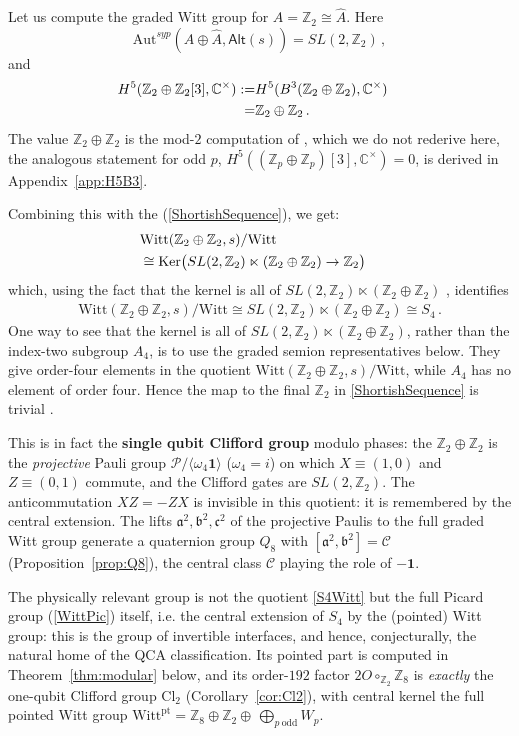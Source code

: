 \documentclass[aps,twocolumn,prx,floatfix,preprintnumbers, nofootinbib,10pt]{revtex4-2}
\numberwithin{equation}{section}
\theoremstyle{definition}
\theoremstyle{remark}
\theoremstyle{claim}
\newcommand{\Perm}{S}
\newcommand{\be}{\begin{equation}}
\newcommand{\ee}{\end{equation}}
\newcommand{\ba}{\begin{aligned}}
\newcommand{\ea}{\end{aligned}}
\newcommand{\Cl}{\text{Cl}}
\newcommand{\ga}{\mathfrak{a}}
\newcommand{\gb}{\mathfrak{b}}
\newcommand{\gc}{\mathfrak{c}}
\newcommand{\Z}{{\mathbb Z}}
\newcommand{\cC}{\mathcal{C}}
\newcommand{\cP}{\mathcal{P}}
\newcommand{\Witt}{\text{Witt}}
\newcommand{\pt}{\text{pt}}
\begin{document}
Let us compute the graded Witt group for $A=\Z_2 \cong \widehat{A}$. Here 
\be
 \text{Aut}^{syp}(A\oplus \widehat{A},\mathsf{Alt}(s)) = SL(2,\Z_2) \,,
\ee
and 
\be\label{H5ClassZ2}
\ba
H^5 (\Z_2\oplus \Z_2 [3], \mathbb{C}^\times)  :=& H^5 (B^3 (\Z_2 \oplus \Z_2), \mathbb{C}^\times)\cr 
=& \Z_2 \oplus \Z_2 \,.
\ea
\ee
The value $\Z_2\oplus\Z_2$ is the mod-$2$ computation of \cite{Bhardwaj:2024xcx}, which we do not rederive here, the analogous statement for odd $p$, $H^5((\Z_p\oplus\Z_p)[3],\mathbb C^\times)=0$, is derived in {Appendix}~\ref{app:H5B3}.


Combining this with the (\ref{ShortishSequence}), we get: 
\be 
\ba
&\Witt(\Z_2\oplus \Z_2,s)/\Witt\cr 
&\cong \text{Ker} \big({SL}(2,\Z_2)\ltimes (\Z_2\oplus \Z_2)\rightarrow \mathbb{Z}_2\big)
\ea
\ee
which, {using the fact that the kernel is all of $SL(2,\Z_2)\ltimes(\Z_2\oplus\Z_2)$ \cite{Bhardwaj:2024xcx},} identifies 
\be\label{S4Witt}
\ba
\boxed{\Witt (\Z_2\oplus \Z_2,s)/\Witt\cong  
SL(2,\Z_2) \ltimes (\Z_2 \oplus \Z_2) \cong 
\Perm_4 }\,.
\ea
\ee
One way to see that the kernel is all of
$SL(2,\Z_2)\ltimes(\Z_2\oplus\Z_2)$, rather than the index-two subgroup $A_4$, is
to use the graded semion representatives below.  They give order-four elements
in the quotient $\Witt(\Z_2\oplus\Z_2,s)/\Witt$, while $A_4$ has no element of
order four.  Hence the map to the final $\Z_2$ in
\eqref{ShortishSequence} is trivial \cite{Bhardwaj:2024xcx}.



This is in fact the {\bf single qubit Clifford group} modulo phases: the $\Z_2\oplus\Z_2$ is the \emph{projective} Pauli group $\cP/\langle \omega_4\bm 1\rangle$ ($\omega_4 = i$) on which $X\equiv(1,0)$ and $Z\equiv(0,1)$ commute, and the Clifford gates are $SL(2,\Z_2)$.  The anticommutation $XZ=-ZX$ is invisible in this quotient: it is remembered by the central extension. The lifts $\ga^2,\gb^2,\gc^2$ of the projective Paulis to the full graded Witt group generate a quaternion group $Q_8$ with $[\ga^2,\gb^2]=\cC$ (Proposition~\ref{prop:Q8}), the central class $\cC$ playing the role of $-\bm 1$.


 
The  physically relevant group is not the quotient \eqref{S4Witt} but the full Picard group  (\ref{WittPic})
itself, i.e. the central extension of $\Perm_4$ by the (pointed) Witt group: this is the group of invertible interfaces, and hence, conjecturally, the natural home of the QCA classification.  Its pointed part is computed in Theorem~\ref{thm:modular} below, and its order-$192$ factor $2O\circ_{\Z_2}\Z_8$ is \emph{exactly} the one-qubit Clifford group $\Cl_2$ (Corollary~\ref{cor:Cl2}), with central kernel the full pointed Witt group $\Witt^\pt=\Z_8\oplus\Z_2\oplus \, \bigoplus_{p\ \mathrm{odd}}W_p$. 
\end{document}
